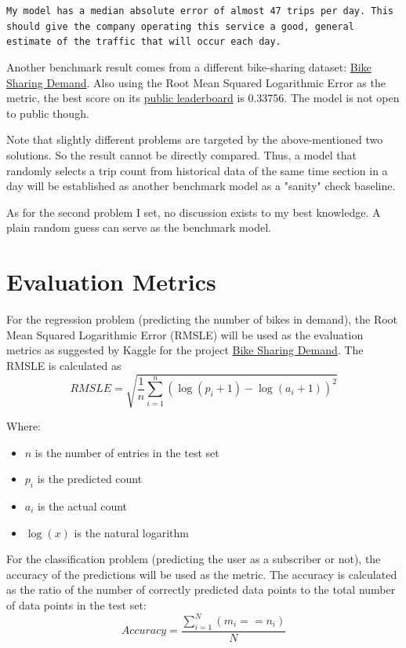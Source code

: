 \documentclass[a4paper]{article}
\begin{document}
	\begin{leftbar}
		\texttt{My model has a median absolute error of almost 47 trips per day. This should give the company operating this service a good, general estimate of the traffic that will occur each day.}
	\end{leftbar}
	
	Another benchmark result comes from a different bike-sharing dataset: \href{https://www.kaggle.com/c/bike-sharing-demand/}{Bike Sharing Demand}. Also using the Root Mean Squared Logarithmic Error as the metric, the best score on its \href{https://www.kaggle.com/c/bike-sharing-demand/leaderboard}{public leaderboard} is 0.33756. The model is not open to public though.
	
	Note that slightly different problems are targeted by the above-mentioned two solutions. So the result cannot be directly compared. Thus, a model that randomly selects a trip count from historical data of the same time section in a day will be established as another benchmark model as a "sanity" check baseline.
	
	As for the second problem I set, no discussion exists to my best knowledge. A plain random guess can serve as the benchmark model.
	
	\section*{Evaluation Metrics}
	
	For the regression problem (predicting the number of bikes in demand), the Root Mean Squared Logarithmic Error (RMSLE) will be used as the evaluation metrics as suggested by Kaggle for the project \href{(https://www.kaggle.com/c/bike-sharing-demand#evaluation)}{Bike Sharing Demand}. The RMSLE is calculated as 
	\begin{equation}
	RMSLE = \sqrt{\frac{1}{n}\sum_{i=1}^{n}(\log(p_i + 1) - \log(a_i + 1))^2}
	\end{equation}
	
	Where:
	\begin{itemize}
		\item $n$ is the number of entries in the test set
		\item $p_i$ is the predicted count
		\item $a_i$ is the actual count
		\item $\log(x)$ is the natural logarithm
	\end{itemize}
		
	For the classification problem (predicting the user as a subscriber or not), the accuracy of the predictions will be used as the metric. The accuracy is calculated as the ratio of the number of correctly predicted data points to the total number of data points in the test set:
	\begin{equation}
	Accuracy = \frac{\sum_{i=1}^{N} (m_i == n_i)}{N}
	\end{equation}
	
\end{document}
